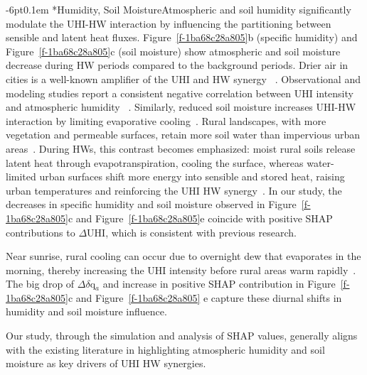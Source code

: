 \documentclass[]{nature}
\makeatletter
\renewcommand{\subsubsection}{\@startsection {subsubsection}{2}{0pt}%
    {-6pt}{0.1em}%
    {\small\sffamily\bfseries\itshape}%
    }
\makeatother
\begin{document}
\subsubsection*{Humidity, Soil Moisture}Atmospheric and soil humidity significantly modulate the UHI-HW interaction by influencing the partitioning between sensible and latent heat fluxes. Figure~\ref{f-1ba68c28a805}b (specific humidity) and Figure~\ref{f-1ba68c28a805}c (soil moisture) show atmospheric and soil moisture decrease during HW periods compared to the background periods. Drier air in cities is a well-known amplifier of the UHI and HW synergy\unskip~\cite{2755510:33598950,2755510:33598924,2755510:33598925,2755510:33598926,2755510:33598952} . Observational and modeling studies report a consistent negative correlation between UHI intensity and atmospheric humidity\unskip~\cite{2755510:33598949,2755510:33598952,2755510:33598937} . Similarly, reduced soil moisture increases UHI-HW interaction by limiting evaporative cooling\unskip~\cite{2755510:33598950,2755510:33598925,2755510:33598926,2755510:33598915}. Rural landscapes, with more vegetation and permeable surfaces, retain more soil water than impervious urban areas\unskip~\cite{2755510:33598915,2755510:33598938}. During HWs, this contrast becomes emphasized: moist rural soils release latent heat through evapotranspiration, cooling the surface, whereas water-limited urban surfaces shift more energy into sensible and stored heat, raising urban temperatures and reinforcing the UHI HW synergy\unskip~\cite{2755510:33598924,2755510:33598925,2755510:33598926,2755510:33598935}. In our study, the decreases in specific humidity and soil moisture observed in Figure~\ref{f-1ba68c28a805}c and Figure~\ref{f-1ba68c28a805}e coincide with positive SHAP contributions to \ensuremath{\Delta }UHI, which is consistent with previous research.

Near sunrise, rural cooling can occur due to overnight dew that evaporates in the morning, thereby increasing the UHI intensity before rural areas warm rapidly\unskip~\cite{2755510:33598926}.  The big drop of \ensuremath{\Delta }\ensuremath{\delta }q\ensuremath{_{a}} and increase in positive SHAP contribution in Figure~\ref{f-1ba68c28a805}c and Figure~\ref{f-1ba68c28a805} e capture these diurnal shifts in humidity and soil moisture influence.

Our study, through the simulation and analysis of SHAP values, generally aligns with the existing literature in highlighting atmospheric humidity and soil moisture as key drivers of UHI HW synergies. 
\end{document}
